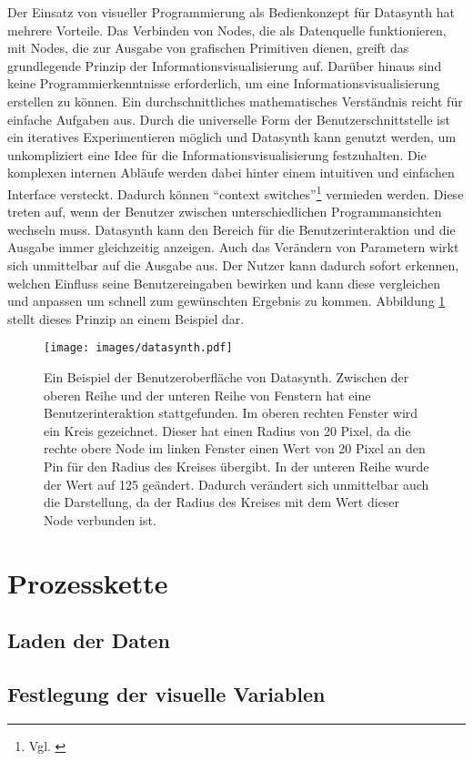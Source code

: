 \documentclass[a4paper, 12pt, DIV=calc, version=first, pdftex, headsepline, footsepline, bibtotocnumbered, liststotocnumbered]{scrreprt}
\begin{document}
Der Einsatz von visueller Programmierung als Bedienkonzept für Datasynth hat
mehrere Vorteile. Das Verbinden von Nodes, die als Datenquelle funktionieren, mit Nodes, die
zur Ausgabe von grafischen Primitiven dienen, greift das grundlegende
Prinzip der Informationsvisualisierung auf.
Darüber hinaus sind keine Programmierkenntnisse erforderlich, um eine Informationsvisualisierung
erstellen zu können. Ein durchschnittliches mathematisches Verständnis reicht für einfache Aufgaben aus.
Durch die universelle Form der Benutzerschnittstelle ist ein iteratives
Experimentieren möglich und Datasynth kann genutzt werden, um unkompliziert eine
Idee für die Informationsvisualisierung festzuhalten.
Die komplexen internen Abläufe werden dabei hinter einem intuitiven und einfachen Interface
versteckt. Dadurch können "`context switches"'\footnote{Vgl. \citep[S.\,50]{Tufte}}
vermieden werden. Diese treten auf, wenn der Benutzer zwischen unterschiedlichen Programmansichten wechseln
muss. Datasynth kann den Bereich für die Benutzerinteraktion und die Ausgabe
immer gleichzeitig anzeigen. Auch das Verändern von Parametern wirkt sich unmittelbar auf die Ausgabe
aus. Der Nutzer kann dadurch sofort erkennen, welchen Einfluss seine Benutzereingaben bewirken und
kann diese vergleichen und anpassen um schnell zum gewünschten Ergebnis zu kommen.
Abbildung \ref{fig:datasynth} stellt dieses Prinzip an einem Beispiel dar.
\begin{figure}
\centering
\texttt{[image: images/datasynth.pdf]}
\caption{Ein Beispiel der Benutzeroberfläche von Datasynth. Zwischen der oberen Reihe
und der unteren Reihe von Fenstern hat eine Benutzerinteraktion stattgefunden.
Im oberen rechten Fenster wird ein Kreis gezeichnet. Dieser hat einen Radius von 20 Pixel, da
die rechte obere Node im linken Fenster einen Wert von 20 Pixel an den Pin für den Radius des Kreises übergibt.
In der unteren Reihe wurde der Wert auf 125 geändert. Dadurch verändert sich unmittelbar
auch die Darstellung, da der Radius des Kreises mit dem Wert dieser Node verbunden ist.}
\label{fig:datasynth}
\end{figure}

\section{Prozesskette}
\subsection{Laden der Daten}
\subsection{Festlegung der visuelle Variablen}
\end{document}
